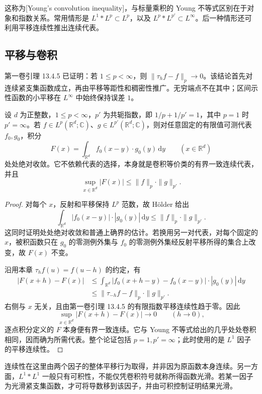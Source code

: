 这称为[Young's convolution inequality]，与标量乘积的 Young 不等式区别在于对象和指数关系。常用情形是 \(L^1*L^p\subset L^p\)，以及 \(L^p*L^{p'}\subset L^\infty\)。后一种情形还可利用平移连续性推出连续代表。

\subsection{平移与卷积}
\label{b2:subsec:030303}

第一卷引理 13.4.5 已证明：若 \(1\leq p<\infty\)，则 \(\|\tau_hf-f\|_p\to0\)。该结论首先对连续紧支集函数成立，再由平移等距性和稠密性推广。无穷端点不在其中；区间示性函数的小平移在 \(L^\infty\) 中始终保持误差 \(1\)。

\begin{proposition}\label{b2:prop:03-convolution-continuity}
设 \(d\) 为正整数，\(1\leq p<\infty\)，\(p'\) 为共轭指数，即 \(1/p+1/p'=1\)，其中 \(p=1\) 时 \(p'=\infty\)。若 \(f\in L^p(\mathbb R^d;\mathbb C)\)、\(g\in L^{p'}(\mathbb R^d;\mathbb C)\)，则对任意固定的有限值可测代表 \(f_0,g_0\)，积分
\[
 F(x)=\int_{\mathbb R^d}f_0(x-y)\cdot g_0(y)\,\mathrm dy
 \qquad(x\in\mathbb R^d)
\]
处处绝对收敛。它不依赖代表的选择，本身就是卷积等价类的有界一致连续代表，并且
\[
 \sup_{x\in\mathbb R^d}|F(x)|\leq\|f\|_p\cdot\|g\|_{p'}.
\]
\end{proposition}
\begin{proof}
对每个 \(x\)，反射和平移保持 \(L^p\) 范数，故 Hölder 给出
\[
 \int_{\mathbb R^d}|f_0(x-y)|\cdot|g_0(y)|\,\mathrm dy
 \leq\|f\|_p\cdot\|g\|_{p'}.
\]
这同时证明处处绝对收敛和普通上确界的估计。若换用另一对代表，对每个固定的 \(x\)，被积函数只在 \(g_0\) 的零测例外集与 \(f_0\) 的零测例外集经反射平移所得的集合上改变，故 \(F(x)\) 不变。

沿用本章 \(\tau_hf(u)=f(u-h)\) 的约定，有
\[
 \begin{aligned}
 |F(x+h)-F(x)|
 &\leq\int_{\mathbb R^d}
 |f_0(x+h-y)-f_0(x-y)|\cdot|g_0(y)|\,\mathrm dy\\
 &\leq\|\tau_{-h}f-f\|_p\cdot\|g\|_{p'}.
 \end{aligned}
\]
右侧与 \(x\) 无关，且由第一卷引理 13.4.5 的有限指数平移连续性趋于零。因此
\[
 \sup_{x\in\mathbb R^d}|F(x+h)-F(x)|\longrightarrow0
 \qquad(h\to0),
\]
逐点积分定义的 \(F\) 本身便有界一致连续。它与 Young 不等式给出的几乎处处卷积相同，因而确为所需代表。整个论证包括 \(p=1,p'=\infty\)；此时使用的是 \(L^1\) 因子的平移连续性。
\end{proof}

连续性在这里由两个因子的整体平移行为取得，并非因为原函数本身连续。另一方面，\(L^1*L^1\) 一般只有可积性，不能仅凭卷积符号就称所得函数光滑。若某一因子为光滑紧支集函数，才可将导数移到该因子，并由可积控制证明结果光滑。


